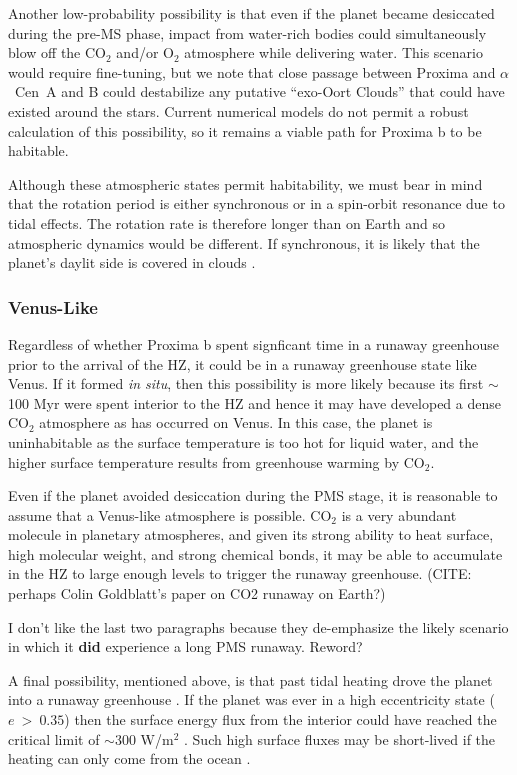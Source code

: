 \documentclass[preprint,12pt]{aastex}
\newcommand{\xxx}[1]{{\color{red} #1}} %
\def\acen{{$\alpha$~Cen}}
\begin{document}
Another low-probability possibility is that even if the planet became
desiccated during the pre-MS phase, impact from water-rich bodies
could simultaneously blow off the CO$_2$ and/or O$_2$ atmosphere while
delivering water. This scenario would require fine-tuning, but we note
that close passage between Proxima and \acen~A and B could destabilize
any putative ``exo-Oort Clouds'' that could have existed around the
stars. Current numerical models do not permit a robust calculation of
this possibility, so it remains a viable path for Proxima b to be
habitable.

Although these atmospheric states permit habitability, we must bear in
mind that the rotation period is either synchronous or in a spin-orbit
resonance due to tidal effects. The rotation rate is therefore longer
than on Earth and so atmospheric dynamics would be different. If
synchronous, it is likely that the planet's daylit side is
covered in clouds \citep{Yang13}.

\subsubsection{Venus-Like}
\label{sec:results:atmstates:venuslike}

Regardless of whether Proxima b spent signficant time in a runaway
greenhouse prior to the arrival of the HZ, it could be in a runaway
greenhouse state like Venus. If it formed {\it in situ}, then this
possibility is more likely because its first $\sim$100 Myr were spent
interior to the HZ and hence it may have developed a dense CO$_2$
atmosphere as has occurred on Venus. In this case, the planet is
uninhabitable as the surface temperature is too hot for liquid water,
and the higher surface temperature results from greenhouse warming by
CO$_2$.

Even if the planet avoided desiccation during the PMS stage, it is
reasonable to assume that a Venus-like atmosphere is possible. CO$_2$
is a very abundant molecule in planetary atmospheres, and given its
strong ability to heat surface, high molecular weight, and strong
chemical bonds, it may be able to accumulate in the HZ to large enough
levels to trigger the runaway greenhouse. \xxx{(CITE: perhaps Colin
Goldblatt's paper on CO2 runaway on Earth?)}

\xxx{I don't like the last two paragraphs because they de-emphasize the likely
scenario in which it \textbf{did} experience a long PMS runaway. Reword?}

A final possibility, mentioned above, is that past tidal heating drove
the planet into a runaway greenhouse \citep{Barnes13}. If the planet
was ever in a high eccentricity state ($e~>~0.35$) then the surface
energy flux from the interior could have reached the critical limit of
$\sim$300 W/m$^2$ \citep{Kasting93,Abe93,Goldblatt15}. Such high
surface fluxes may be short-lived if the heating can only come from
the ocean \citep{DriscollBarnes15}.
\end{document}

